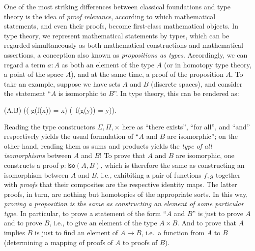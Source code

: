 One of the most striking differences between classical foundations and type theory is the idea of \emph{proof relevance}, according to which mathematical statements, and even their proofs, become first-class mathematical objects.
In type theory, we represent mathematical statements by types, which can be regarded simultaneously as both mathematical constructions and mathematical assertions, a conception also known as \emph{propositions as types}.
%
Accordingly, we can regard a term $a : A$ as both an element of the type $A$ (or in homotopy type theory, a point of the space $A$), and at the same time, a proof of the proposition $A$.
To take an example, suppose we have sets $A$ and $B$ (discrete spaces),
%
and consider the statement ``$A$ is isomorphic to $B$''.
In type theory, this can be rendered as:
\begin{narrowmultline*}
  (A,B)  \narrowbreak
  \Big(\big( g(f(x)) = x\big) \times \big(\, f(g(y)) = y\big)\Big).
\end{narrowmultline*}
%
Reading the type constructors $\Sigma, \Pi, \times$  here  as ``there exists'', ``for all'', and ``and'' respectively yields the usual formulation of ``$A$ and $B$ are isomorphic''; on the other hand, reading them as sums and products yields the \emph{type of all isomorphisms} between $A$ and $B$!  To prove that $A$ and $B$ are isomorphic, one  constructs a proof $p : \mathsf{Iso}(A,B)$, which is therefore the same  as constructing an isomorphism between $A$ and $B$, i.e., exhibiting a pair of functions $f, g$ together with \emph{proofs} that their composites are the respective identity maps.  The latter proofs, in turn, are nothing but homotopies of the appropriate sorts.  In this way, \emph{proving a proposition is the same as constructing an element of some particular type.}
In particular, to prove a statement of the form ``$A$ and $B$'' is just to prove $A$ and to prove $B$, i.e., to give an element of the type $A\times B$.
And to prove that $A$ implies $B$ is just to find an element of $A\to B$, i.e.\ a function from $A$ to $B$ (determining a mapping of proofs of $A$ to proofs of $B$).

